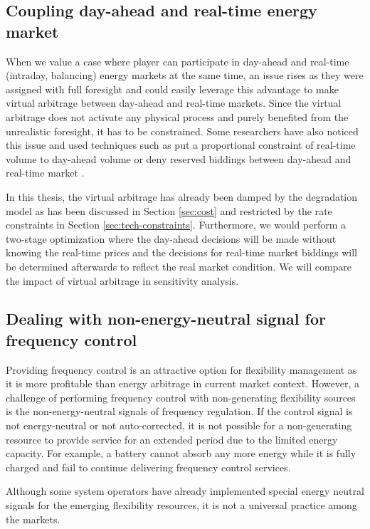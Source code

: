 \subsection{Coupling day-ahead and real-time energy market}

When we value a case where player can participate in day-ahead and real-time (intraday, balancing) energy markets at the same time, an issue rises as they were assigned with full foresight and could easily leverage this advantage to make virtual arbitrage between day-ahead and real-time markets. Since the virtual arbitrage does not activate any physical process and purely benefited from the unrealistic foresight, it has to be constrained. Some researchers have also noticed this issue and used techniques such as put a proportional constraint of real-time volume to day-ahead volume \cite{Han2017} or deny reserved biddings between day-ahead and real-time market \cite{Berrada2016}.

In this thesis, the virtual arbitrage has already been damped by the degradation model as has been discussed in Section \ref{sec:cost} and restricted by the rate constraints in Section \ref{sec:tech-constraints}. Furthermore, we would perform a two-stage optimization where the day-ahead decisions will be made without knowing the real-time prices and the decisions for real-time market biddings will be determined afterwards to reflect the real market condition. We will compare the impact of virtual arbitrage in sensitivity analysis. 

\subsection{Dealing with non-energy-neutral signal for frequency control}
Providing frequency control is an attractive option for flexibility management as it is more profitable than energy arbitrage in current market context. However, a challenge of performing frequency control with non-generating flexibility sources is the non-energy-neutral signals of frequency regulation. If the control signal is not energy-neutral or not auto-corrected, it is not possible for a non-generating resource to provide service for an extended period due to the limited energy capacity. For example, a battery cannot absorb any more energy while it is fully charged and fail to continue delivering frequency control services.

Although some system operators have already implemented special energy neutral signals for the emerging flexibility resources, it is not a universal practice among the markets. 

